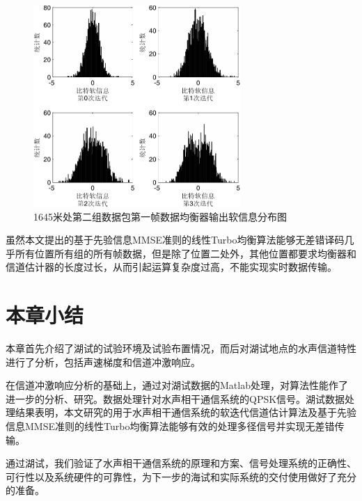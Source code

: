 \begin{figure}[htb]
  \begin{center}
    \includegraphics[width=0.7\textwidth]{images/softInfo_4_2.pdf}
  \end{center}
  \caption{1645米处第二组数据包第一帧数据均衡器输出软信息分布图}
  \label{fig:6.16s}
\end{figure}
虽然本文提出的基于先验信息MMSE准则的线性Turbo均衡算法能够无差错译码几乎所有位置所有组的所有帧数据，但是除了位置二处外，其他位置都要求均衡器和信道估计器的长度过长，从而引起运算复杂度过高，不能实现实时数据传输。
\section{本章小结}
本章首先介绍了湖试的试验环境及试验布置情况，而后对湖试地点的水声信道特性进行了分析，包括声速梯度和信道冲激响应。

在信道冲激响应分析的基础上，通过对湖试数据的Matlab处理，对算法性能作了进一步的分析、研究。数据处理针对水声相干通信系统的QPSK信号。湖试数据处理结果表明，本文研究的用于水声相干通信系统的软迭代信道估计算法及基于先验信息MMSE准则的线性Turbo均衡算法能够有效的处理多径信号并实现无差错传输。

通过湖试，我们验证了水声相干通信系统的原理和方案、信号处理系统的正确性、可行性以及系统硬件的可靠性，为下一步的海试和实际系统的交付使用做好了充分的准备。
%
\clearpage{\pagestyle{empty}\cleardoublepage}

